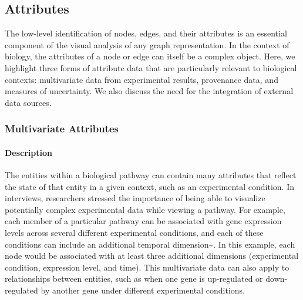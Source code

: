 \subsection*{Attributes}

The low-level identification of nodes, edges, and their attributes is an essential component of the visual analysis of any graph representation.
In the context of biology, the attributes of a node or edge can itself be a complex object.
Here, we highlight three forms of attribute data that are particularly relevant to biological contexts: multivariate data from experimental results, provenance data, and measures of uncertainty.
We also discuss the need for the integration of external data sources.

\subsubsection*{Multivariate Attributes}

\paragraph*{Description}

The entities within a biological pathway can contain many attributes that reflect the state of that entity in a given context, such as an experimental condition.
In interviews, researchers stressed the importance of being able to visualize potentially complex experimental data while viewing a pathway.
For example, each member of a particular pathway can be associated with gene expression levels across several different experimental conditions, and each of these conditions can include an additional temporal dimension\textasciitilde{}\cite{Barsky2008cerebral}.
In this example, each node would be associated with at least three additional dimensions (experimental condition, expression level, and time).
This multivariate data can also apply to relationships between entities, such as when one gene is up-regulated or down-regulated by another gene under different experimental conditions.

